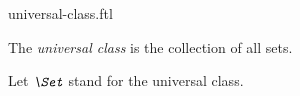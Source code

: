 \documentclass{naproche-library}
\begin{document}
\begin{smodule}[title=The Universal Class]{universal-class.ftl}

\begin{definition}[forthel,id=FOUNDATIONS_10_9625487120366325]
  The \emph{universal class} is the collection of all sets.

  Let $\emph{\Set}$ stand for the universal class.
\end{definition}
\end{smodule}
\end{document}
